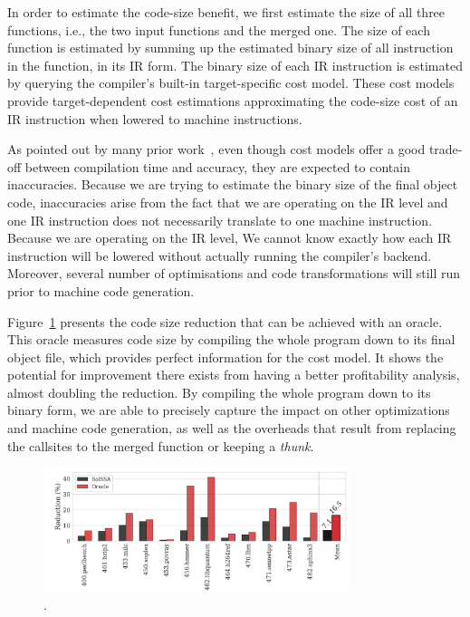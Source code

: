 In order to estimate the code-size benefit, we first estimate the size of all three functions, i.e., the two input functions and the merged one.
The size of each function is estimated by summing up the estimated binary size of all instruction in the function, in its IR form.
The binary size of each IR instruction is estimated by querying the compiler's built-in target-specific cost model.
These cost models provide target-dependent cost estimations approximating the code-size cost of an IR instruction when lowered to machine instructions.

As pointed out by many prior work~\cite{porpodas18,rocha19,rocha20}, even though cost models offer a good trade-off between compilation time and accuracy, they are expected to contain inaccuracies.
Because we are trying to estimate the binary size of the final object code, inaccuracies arise from the fact that we are operating on the IR level and one IR instruction does not necessarily translate to one machine instruction.
Because we are operating on the IR level, We cannot know exactly how each IR instruction will be lowered without actually running the compiler's backend.
Moreover, several number of optimisations and code transformations will still run prior to machine code generation.

Figure~\ref{fig:oracle-reduction} presents the code size reduction that can be achieved with an oracle.
This oracle measures code size by compiling the whole program down to its final object file, which provides perfect information for the cost model.
It shows the potential for improvement there exists from having a better profitability analysis, almost doubling the reduction.
By compiling the whole program down to its binary form, we are able to precisely capture the impact on other optimizations and machine code generation, as well as the overheads that result from replacing the callsites to the merged function or keeping a \textit{thunk}.

\begin{figure}[h]
  \centering
  \includegraphics[width=0.8\textwidth]{src/deeplearning/figs/motivation-oracle-reduction.pdf}
  \caption{.}
  \label{fig:oracle-reduction}
\end{figure}

